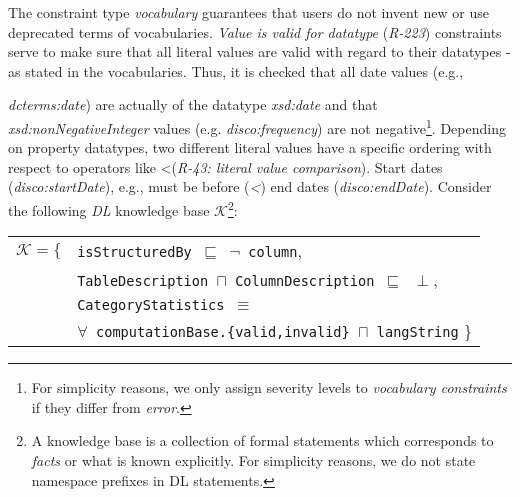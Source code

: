 \documentclass{llncs}
\newcommand{\ms}[1]{\texttt{#1}}
\newenvironment{DL}{
  \small
  \vspace{0cm}
	\begin{center}
  \begin{tabular}{c l}

}{
  \end{tabular}
	\end{center}
}
\begin{document}
{The constraint type \emph{vocabulary} guarantees that users do not invent new or use deprecated terms of vocabularies.
\emph{Value is valid for datatype} (\emph{R-223}) constraints serve to make sure that all literal values are valid with regard to their datatypes - as stated in the vocabularies.
Thus, it is checked that all date values (e.g., {{\em dcterms:date}) are actually of the datatype \emph{xsd:date} and that \emph{xsd:nonNegativeInteger} values (e.g. \emph{disco:frequency}) are not negative\footnote{For simplicity reasons, we only assign severity levels to \emph{vocabulary constraints} if they differ from \emph{error}.}.
Depending on property datatypes, two different literal values have
a specific ordering with respect to operators like \textless  (\emph{R-43: literal value comparison}).
Start dates (\emph{disco:startDate}), e.g., must be before (\emph{\textless}) end dates (\emph{disco:endDate}).
Consider the following \emph{DL} knowledge base $\mathcal{K}$\footnote{A knowledge base is a collection of formal statements which corresponds to \emph{facts} or what is known explicitly. For simplicity reasons, we do not state namespace prefixes in DL statements.}:
\begin{center}
\begin{DL} 
$\mathcal{K}=\{$ 
	&\ms{isStructuredBy $\sqsubseteq$ $\neg$ column}, \\
	&\ms{TableDescription $\sqcap$ ColumnDescription $\sqsubseteq$ $\perp$}, \\
	&\ms{CategoryStatistics $\equiv$} \\
	&\ms{$\forall$ computationBase.\{valid,invalid\} $\sqcap$ langString}
 \}\\ 
\end{DL}
\end{center}

}}
\end{document}
